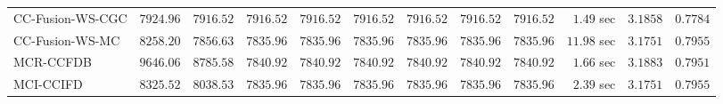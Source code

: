 \begin{table}[H]
\begin{tabular}{lrrrrrrrrrrr}
    CC-Fusion-WS-CGC & $      7924.96$ & $      7916.52$ & $      7916.52$ & $      7916.52$ & $      7916.52$ & $      7916.52$ & $      7916.52$ & $      7916.52$ & $         1.49$ sec    & $       3.1858$  & $       0.7784$ \\ 
     CC-Fusion-WS-MC & $      8258.20$ & $      7856.63$ & $      7835.96$ & $      7835.96$ & $      7835.96$ & $      7835.96$ & $      7835.96$ & $      7835.96$ & $        11.98$ sec    & $       3.1751$  & $       0.7955$ \\ 
\cmidrule{1-1} 
           MCR-CCFDB & $      9646.06$ & $      8785.58$ & $      7840.92$ & $      7840.92$ & $      7840.92$ & $      7840.92$ & $      7840.92$ & $      7840.92$ & $         1.66$ sec    & $       3.1883$  & $       0.7951$ \\ 
\cmidrule{1-1} 
           MCI-CCIFD & $      8325.52$ & $      8038.53$ & $      7835.96$ & $      7835.96$ & $      7835.96$ & $      7835.96$ & $      7835.96$ & $      7835.96$ & $         2.39$ sec    & $       3.1751$  & $       0.7955$ \\ 
\bottomrule
\end{tabular}
\end{table}

